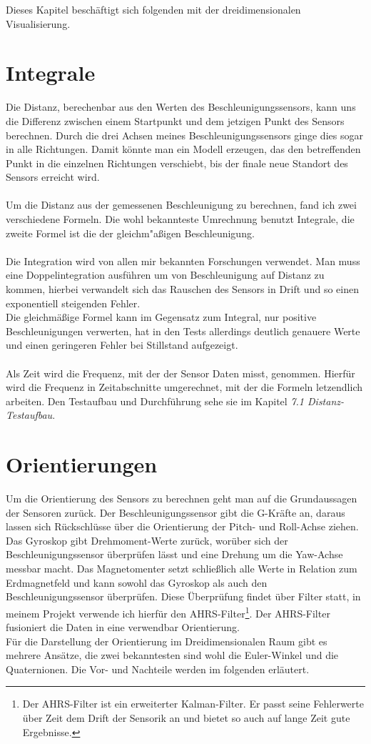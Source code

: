 Dieses Kapitel beschäftigt sich folgenden mit der dreidimensionalen Visualisierung.

\section{Integrale}
Die Distanz, berechenbar aus den Werten des Beschleunigungssensors, kann uns die Differenz zwischen einem Startpunkt
und dem jetzigen Punkt des Sensors berechnen. Durch die drei Achsen meines Beschleunigungssensors ginge dies sogar in alle Richtungen. Damit 
könnte man ein Modell erzeugen, das den betreffenden Punkt in die einzelnen Richtungen verschiebt, bis der finale
neue Standort des Sensors erreicht wird. \\ 
\\ 
Um die Distanz aus der gemessenen Beschleunigung zu berechnen,
fand ich zwei verschiedene Formeln. Die wohl bekannteste Umrechnung 
benutzt Integrale, die zweite Formel ist die der gleichm"aßigen 
Beschleunigung.\\
\\
Die Integration wird von allen mir bekannten Forschungen verwendet. 
Man muss eine Doppelintegration
ausführen um von Beschleunigung auf Distanz zu kommen, hierbei verwandelt 
sich das Rauschen des Sensors in Drift und so einen exponentiell steigenden
Fehler. \\ 
Die gleichmäßige Formel kann im Gegensatz zum Integral, nur positive 
Beschleunigungen verwerten, hat in den Tests allerdings 
deutlich genauere Werte und einen geringeren Fehler bei Stillstand 
aufgezeigt. \\
\\
Als Zeit wird die Frequenz, mit der der Sensor Daten misst, 
genommen. Hierfür wird die Frequenz in Zeitabschnitte umgerechnet, mit 
der die Formeln letzendlich arbeiten. Den Testaufbau und Durchführung 
sehe sie im Kapitel \textit{ 7.1 Distanz-Testaufbau}.


\section{Orientierungen}
Um die Orientierung des Sensors zu berechnen geht man auf die Grundaussagen der Sensoren zurück. Der 
Beschleunigungssensor gibt die G-Kräfte an, daraus lassen sich Rückschlüsse über die Orientierung 
der Pitch- und Roll-Achse ziehen. Das Gyroskop gibt Drehmoment-Werte zurück, worüber sich der Beschleunigungssensor
überprüfen lässt und eine Drehung um die Yaw-Achse messbar macht. Das Magnetomenter setzt schließlich alle Werte in
Relation zum Erdmagnetfeld und kann sowohl das Gyroskop als auch den Beschleunigungssensor überprüfen. Diese Überprüfung
findet über Filter statt, in meinem Projekt verwende ich hierfür den AHRS-Filter\footnote{Der AHRS-Filter 
ist ein erweiterter Kalman-Filter. Er passt seine Fehlerwerte über Zeit dem Drift der Sensorik an und bietet so auch 
auf lange Zeit gute Ergebnisse.}. Der AHRS-Filter fusioniert die Daten in eine verwendbar Orientierung.\\
Für die Darstellung der Orientierung im Dreidimensionalen Raum gibt es mehrere Ansätze, die zwei bekanntesten 
sind wohl die Euler-Winkel und die Quaternionen. Die Vor- und Nachteile werden im folgenden erläutert.
